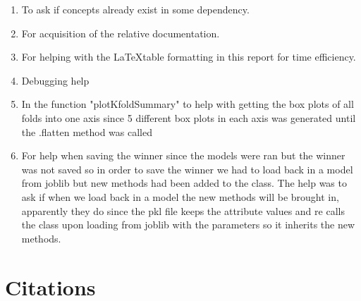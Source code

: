 \documentclass[12pt, a4paper]{article}
\begin{document}
\begin{multicols}{2}
    \begin{enumerate} \label{enm:llm}
        \item To ask if concepts already exist in some dependency.
        \item For acquisition of the relative documentation.
        \item For helping with the \LaTeX table formatting in this report for time efficiency.
        \item Debugging help
        \item In the function "plotKfoldSummary" to help with getting the box plots of all folds into one axis since 5 different box plots in each axis was generated until the .flatten method was called
        \item For help when saving the winner since the models were ran but the winner was not saved so in order to save the winner we had to load back in a model from joblib but new methods had been added to the class. The help was to ask if when we load back in a model the new methods will be brought in, apparently they do since the pkl file keeps the attribute values and re calls the class upon loading from joblib with the parameters so it inherits the new methods.
    \end{enumerate}

    \section{Citations} \label{sec:citations}

    \printbibliography

\end{multicols}
\end{document}
